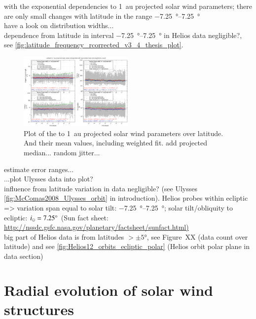 with the exponential dependencies to 1~au projected solar wind parameters; there are only small changes with latitude in the range \SIrange{-7.25}{7.25}{\degree}\\
have a look on distribution widths...\\

dependence from latitude in interval \SIrange{-7.25}{7.25}{\degree} in Helios data negligible?, see \autoref{fig:latitude_frequency_rcorrected_v3_4_thesis_plot}.
\begin{figure}[htb]
	\centering
	\includegraphics[width=0.5\textwidth]{images/gnuplots/latitude_frequency_rcorrected_v3_4_thesis_plot.png}
	\caption{Plot of the to 1~au projected solar wind parameters over latitude. And their mean values, including weighted fit. add projected median... random jitter...}
	\label{fig:latitude_frequency_rcorrected_v3_4_thesis_plot}
\end{figure}
estimate error ranges...\\

...plot Ulysses data into plot?\\

influence from latitude variation in data negligible? (see Ulysses \autoref{fig:McComas2008_Ulysses_orbit} in introduction). Helios probes within ecliptic => variation span equal to solar tilt: \SIrange{-7.25}{7.25}{\degree}; solar tilt/obliquity to ecliptic: $i_\odot = 7.25\degree$ (Sun fact sheet: \url{http://nssdc.gsfc.nasa.gov/planetary/factsheet/sunfact.html)}\\
big part of Helios data is from latitudes $>\pm5$°, see Figure~XX (data count over latitude) and see \autoref{fig:Helios12_orbits_ecliptic_polar} (Helios orbit polar plane in data section)\\


\section{Radial evolution of solar wind structures}

